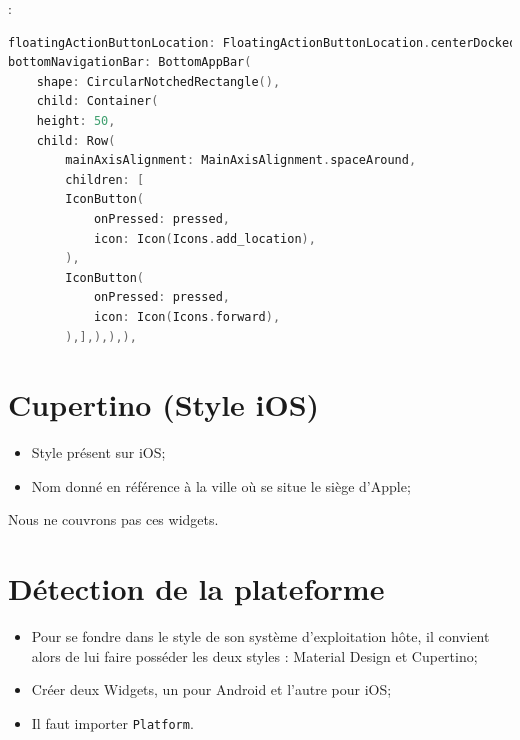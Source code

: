 \documentclass[10pt]{beamer}
\begin{document}
\begin{frame}[fragile]{\secname : \subsecname}
    \begin{lstlisting}[language=C]
floatingActionButtonLocation: FloatingActionButtonLocation.centerDocked,
bottomNavigationBar: BottomAppBar(
    shape: CircularNotchedRectangle(),
    child: Container(
    height: 50,
    child: Row(
        mainAxisAlignment: MainAxisAlignment.spaceAround,
        children: [
        IconButton(
            onPressed: pressed,
            icon: Icon(Icons.add_location),
        ),
        IconButton(
            onPressed: pressed,
            icon: Icon(Icons.forward),
        ),],),),),
    \end{lstlisting}
\end{frame}


\section{Cupertino (Style iOS)}
\begin{frame}[fragile]{\secname}
    \begin{itemize}
        \item Style présent sur iOS;
        \item Nom donné en référence à la ville où se situe le siège d’Apple;
    \end{itemize}
    Nous ne couvrons pas ces widgets.
\end{frame}

\section{Détection de la plateforme}
\begin{frame}[fragile]{\secname}
    \begin{itemize}
        \item Pour se fondre dans le style de son système d’exploitation hôte, il convient alors de lui faire posséder les deux styles : Material Design et Cupertino;
        \item Créer deux Widgets, un pour Android et l’autre pour iOS;
        \item Il faut importer \lstinline[language=c]!Platform!.
    \end{itemize}
\end{frame}
\end{document}
